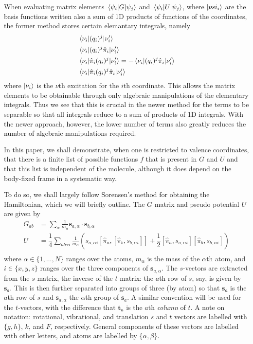 \documentclass{article}
\newcommand{\vect}[1]{\boldsymbol{#1}}
\begin{document}
When evaluating matrix elements $\matrixel{\psi_i}{G}{\psi_j}$ and $\matrixel{\psi_i}{U}{\psi_j}$, where $\ket{psi_i}$ are the basis functions written also a sum of 1D products of functions of the coordinates, the former method stores certain elemantary integrals, namely
\[
	\begin{split}
		&\matrixel{\nu_i}{(q_i)^j}{\nu_i'} \\
		&\matrixel{\nu_i}{(q_i)^j\hat{\pi}_i}{\nu_i'} \\
		&\matrixel{\nu_i}{\hat{\pi}_i (q_i)^j}{\nu_i'} = - \matrixel{\nu_i}{(q_i)^j \hat{\pi}_i}{\nu_i'}\\
		&\matrixel{\nu_i}{\hat{\pi}_i (q_i)^j\hat{\pi}_i}{\nu_i'} \\
	\end{split}
\]
where $\ket{\nu_i}$ is the $\nu$th excitation for the $i$th coordinate. This allows the matrix elements to be obtainable through only algebraic manipulations of the elementary integrals. Thus we see that this is crucial in the newer method for the terms to be separable so that all integrals reduce to a sum of products of 1D integrals. With the newer approach, however, the lower number of terms also greatly reduces the number of algebraic manipulations required. 

In this paper, we shall demonstrate, when one is restricted to valence coordinates, that there is a finite list of possible functions $f$ that is present in $G$ and $U$ and that this list is independent of the molecule, although it does depend on the body-fixed frame in a systematic way.   

To do so, we shall largely follow Sorensen's method for obtaining the Hamiltonian, which we will briefly outline. The $G$ matrix and pseudo potential $U$ are given by
\[
\begin{split}
G_{ab} &= \sum_{\alpha} \frac{1}{m_\alpha}\vect{s}_{a, \alpha}\cdot \vect{s}_{b, \alpha} \\
U &= \dfrac14 \sum_{ab \alpha i} \frac{1}{m_\alpha}(s_{a,\alpha i}[\hat{\pi}_a,[\hat{\pi}_b, s_{b,\alpha i}]] + \dfrac12 [\hat{\pi}_a, s_{a,\alpha i}][\hat{\pi}_b, s_{b,\alpha i}]) \\
\end{split}
\]
where $\alpha \in \{ 1, \ldots, N \}$ ranges over the atoms, $m_{\alpha}$ is the mass of the $\alpha$th atom, and $i \in \{ x,y,z\}$ ranges over the three components of $\vect{s}_{a,\alpha}$. The $s$-vectors are extracted from the $s$ matrix, the inverse of the $t$ matrix: the $a$th row of $s$, say, is given by $\vect{s}_{a}$. This is then further separated into groups of three (by atom) so that $\vect{s}_{a}$ is the $a$th row of $s$ and $\vect{s}_{a, \alpha}$ the $\alpha$th group of $\vect{s}_a$. A similar convention will be used for the $t$-vectors, with the difference that $\vect{t}_a$ is the $a$th \emph{column} of $t$. A note on notation: rotational, vibrational, and translation $s$ and $t$ vectors are labelled with $\{g, h\}$, $k$, and $F$, respectively. General components of these vectors are labelled with other letters, and atoms are labelled by $\{\alpha, \beta\}$.  
\end{document}
